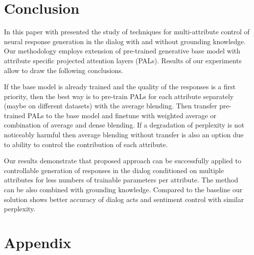 \documentclass[11pt]{article}
\begin{document}
\section{Conclusion}

In this paper with presented the study of techniques for multi-attribute control of neural response generation in the dialog with and without grounding knowledge. Our methodology employs extension of pre-trained generative base model with attribute specific projected attention layers (PALs). Results of our experiments allow to draw the following conclusions.

If the base model is already trained and the quality of the responses is a first priority, then the best way is to pre-train PALs for each attribute separately (maybe on different datasets) with the average blending. Then transfer pre-trained PALs to the base model and finetune with weighted average or combination of average and dense blending. If a degradation of perplexity is not noticeably harmful then average blending without transfer is also an option due to ability to control the contribution of each attribute.

Our results demonstrate that proposed approach can be successfully applied to controllable generation of responses in the dialog  conditioned on multiple attributes for less numbers of trainable parameters per attribute. The method can be also combined with grounding knowledge.  Compared to the baseline our solution shows better accuracy of dialog acts and sentiment control with similar perplexity.%





\appendix

\section{Appendix}
\label{sec:appendix}




\end{document}
